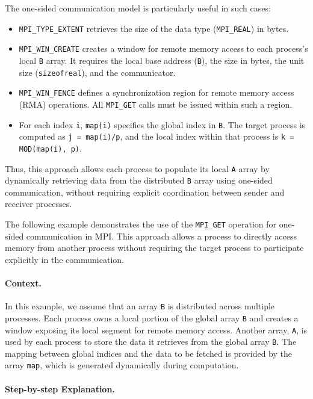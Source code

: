 \documentclass[12pt]{book}
\begin{document}
The one-sided communication model is particularly useful in such cases:
\begin{itemize}
    \item \texttt{MPI\_TYPE\_EXTENT} retrieves the size of the data type (\texttt{MPI\_REAL}) in bytes.
    \item \texttt{MPI\_WIN\_CREATE} creates a window for remote memory access to each process's local \texttt{B} array. It requires the local base address (\texttt{B}), the size in bytes, the unit size (\texttt{sizeofreal}), and the communicator.
    \item \texttt{MPI\_WIN\_FENCE} defines a synchronization region for remote memory access (RMA) operations. All \texttt{MPI\_GET} calls must be issued within such a region.
    \item For each index \texttt{i}, \texttt{map(i)} specifies the global index in \texttt{B}. The target process is computed as \texttt{j = map(i)/p}, and the local index within that process is \texttt{k = MOD(map(i), p)}.
\end{itemize}

Thus, this approach allows each process to populate its local \texttt{A} array by dynamically retrieving data from the distributed \texttt{B} array using one-sided communication, without requiring explicit coordination between sender and receiver processes.

The following example demonstrates the use of the \texttt{MPI\_GET} operation for one-sided communication in MPI. This approach allows a process to directly access memory from another process without requiring the target process to participate explicitly in the communication.

\paragraph{Context.}
In this example, we assume that an array \texttt{B} is distributed across multiple processes. Each process owns a local portion of the global array \texttt{B} and creates a window exposing its local segment for remote memory access. Another array, \texttt{A}, is used by each process to store the data it retrieves from the global array \texttt{B}. The mapping between global indices and the data to be fetched is provided by the array \texttt{map}, which is generated dynamically during computation.

\paragraph{Step-by-step Explanation.}
\end{document}
